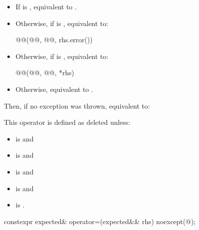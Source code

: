 \begin{itemdescr}
\pnum
\effects
\begin{itemize}
\item
If  is ,
equivalent to .
\item
Otherwise, if  is , equivalent to:
\begin{codeblock}
@@(@@, @@, rhs.error())
\end{codeblock}
\item
Otherwise, if  is , equivalent to:
\begin{codeblock}
@@(@@, @@, *rhs)
\end{codeblock}
\item
Otherwise, equivalent to .
\end{itemize}
Then, if no exception was thrown,
equivalent to: 

\pnum
\remarks
This operator is defined as deleted unless:
\begin{itemize}
\item
{} is  and
\item
{} is  and
\item
{} is  and
\item
{} is  and
\item
{}
is .
\end{itemize}
\end{itemdescr}

%
\begin{itemdecl}
constexpr expected& operator=(expected&& rhs) noexcept(@\seebelow@);
\end{itemdecl}

